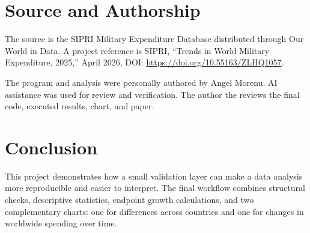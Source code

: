 \documentclass[conference]{IEEEtran}
\begin{document}
\section{Source and Authorship}
The source is the SIPRI Military Expenditure Database distributed through Our
World in Data. A project reference is SIPRI, ``Trends in World Military
Expenditure, 2025,'' April 2026, DOI:
\url{https://doi.org/10.55163/ZLHQ1057}.

The program and analysis were personally authored by Angel Morenu. AI
assistance was used for review and verification. The author the reviews the final code, executed
results, chart, and paper.

\section{Conclusion}
This project demonstrates how a small validation layer can make a data
analysis more reproducible and easier to interpret. The final workflow
combines structural checks, descriptive statistics, endpoint growth
calculations, and two complementary charts: one for differences across
countries and one for changes in worldwide spending over time.
\end{document}
